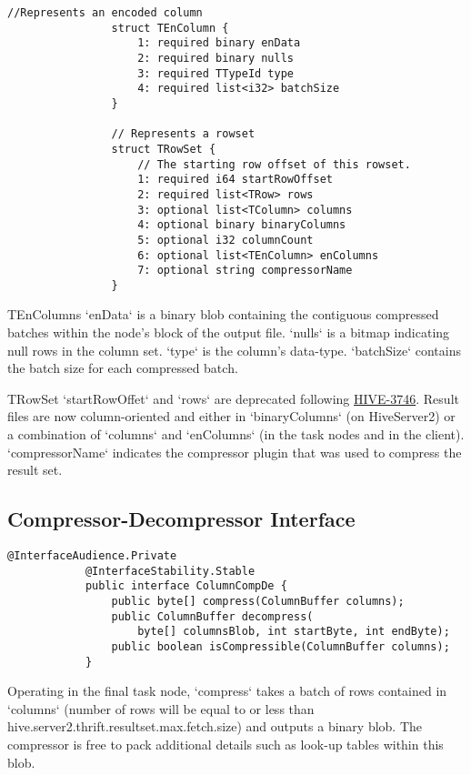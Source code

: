 \documentclass[11pt,a4paper]{article}
\begin{document}
			\begin{lstlisting}[title=TCLIService.thrift,gobble=8,otherkeywords={binary,i32,i64,string,struct,TColumn,TEnColumn,TRow,TRowSet,TTypeId}]
				//Represents an encoded column
				struct TEnColumn {
					1: required binary enData
					2: required binary nulls
					3: required TTypeId type
					4: required list<i32> batchSize
				}
				
				// Represents a rowset
				struct TRowSet {
					// The starting row offset of this rowset.
					1: required i64 startRowOffset
					2: required list<TRow> rows
					3: optional list<TColumn> columns
					4: optional binary binaryColumns
					5: optional i32 columnCount
					6: optional list<TEnColumn> enColumns
					7: optional string compressorName
				}
			\end{lstlisting}
			
			TEnColumns `enData` is a binary blob containing the contiguous compressed batches within the node's block of the output file.
			`nulls` is a bitmap indicating null rows in the column set.
			`type` is the column's data-type.
			`batchSize` contains the batch size for each compressed batch.
			
			TRowSet `startRowOffet` and `rows` are deprecated following \href{https://issues.apache.org/jira/browse/HIVE-3746}{HIVE-3746}.
			Result files are now column-oriented and either in `binaryColumns` (on HiveServer2) or a combination of `columns` and `enColumns` (in the task nodes and in the client).
			`compressorName` indicates the compressor plugin that was used to compress the result set.
			
	\subsection{Compressor-Decompressor Interface}
		\begin{lstlisting}[title=org.apache.hive.service.cli.CompDe; CompDe.java,gobble=6,otherkeywords={ColumnBuffer}]
			@InterfaceAudience.Private
			@InterfaceStability.Stable
			public interface ColumnCompDe {
				public byte[] compress(ColumnBuffer columns);
				public ColumnBuffer decompress(
					byte[] columnsBlob, int startByte, int endByte);
				public boolean isCompressible(ColumnBuffer columns);
			}
		\end{lstlisting}
		
		Operating in the final task node, `compress` takes a batch of rows contained in `columns` (number of rows will be equal to or less than \linebreak hive.server2.thrift.resultset.max.fetch.size) and outputs a binary blob.
		The compressor is free to pack additional details such as look-up tables within this blob.
		
\end{document}
